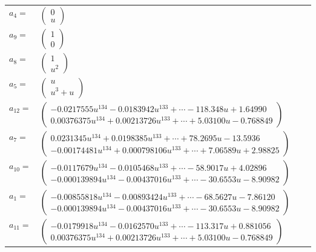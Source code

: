 \documentclass[1p]{elsarticle_modified}
\theoremstyle{definition}
\begin{document}
\begin{tabular}{m{7pt} m{180pt} m{7pt} m{180pt} }
\flushright $a_{4}=$&$\begin{pmatrix}0\\u\end{pmatrix}$ \\
\flushright $a_{9}=$&$\begin{pmatrix}1\\0\end{pmatrix}$ \\
\flushright $a_{8}=$&$\begin{pmatrix}1\\u^2\end{pmatrix}$ \\
\flushright $a_{5}=$&$\begin{pmatrix}u\\u^3+u\end{pmatrix}$ \\
\flushright $a_{12}=$&$\begin{pmatrix}-0.0217555 u^{134}-0.0183942 u^{133}+\cdots-118.348 u+1.64990\\0.00376375 u^{134}+0.00213726 u^{133}+\cdots+5.03100 u-0.768849\end{pmatrix}$ \\
\flushright $a_{7}=$&$\begin{pmatrix}0.0231345 u^{134}+0.0198385 u^{133}+\cdots+78.2695 u-13.5936\\-0.00174481 u^{134}+0.000798106 u^{133}+\cdots+7.06589 u+2.98825\end{pmatrix}$ \\
\flushright $a_{10}=$&$\begin{pmatrix}-0.0117679 u^{134}-0.0105468 u^{133}+\cdots-58.9017 u+4.02896\\-0.000139894 u^{134}-0.00437016 u^{133}+\cdots-30.6553 u-8.90982\end{pmatrix}$ \\
\flushright $a_{1}=$&$\begin{pmatrix}-0.00855818 u^{134}-0.00893424 u^{133}+\cdots-68.5627 u-7.86120\\-0.000139894 u^{134}-0.00437016 u^{133}+\cdots-30.6553 u-8.90982\end{pmatrix}$ \\
\flushright $a_{11}=$&$\begin{pmatrix}-0.0179918 u^{134}-0.0162570 u^{133}+\cdots-113.317 u+0.881056\\0.00376375 u^{134}+0.00213726 u^{133}+\cdots+5.03100 u-0.768849\end{pmatrix}$ \\

\end{tabular}
\end{document}
